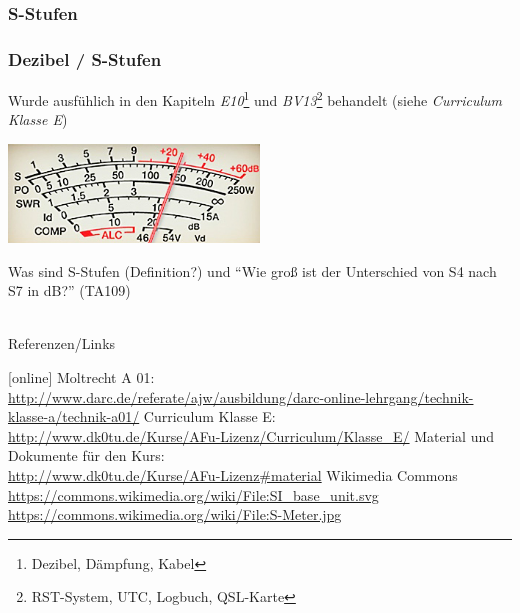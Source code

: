 \subsubsection{S-Stufen}

\begin{frame}
    \frametitle{Dezibel / S-Stufen}

    Wurde ausfühlich in den Kapiteln \emph{E10}\footnote{Dezibel, Dämpfung,
    Kabel} und \emph{BV13}\footnote{RST-System, UTC, Logbuch, QSL-Karte}
    behandelt (siehe \emph{Curriculum Klasse E}\hyperlink{refs}{\cite{curr}})

    \begin{center}
        \includegraphics[width=0.5\textwidth,height=0.2\textheight,keepaspectratio]{e10/S-Meter.jpg}
        \tiny \hyperlink{refs}{\cite{wc}}
    \end{center}


    \begin{exampleblock}{Was sind S-Stufen (Definition?) und ``Wie groß ist der
                         Unterschied von S4 nach S7 in dB?'' (TA109)}
    \end{exampleblock}

\end{frame}

\renewcommand{\refname}{Referenzen}

\hypertarget{refs}{}
\textcolor{white}{} \\ %
\Large Referenzen/Links
\footnotesize

\begin{thebibliography}{}
    [online]
     Moltrecht A 01: \\
                    \url{http://www.darc.de/referate/ajw/ausbildung/darc-online-lehrgang/technik-klasse-a/technik-a01/}
      Curriculum Klasse E: \\
                    \url{http://www.dk0tu.de/Kurse/AFu-Lizenz/Curriculum/Klasse_E/}
       Material und Dokumente für den Kurs: \\
                    \url{http://www.dk0tu.de/Kurse/AFu-Lizenz#material}
        Wikimedia Commons \\
                    \url{https://commons.wikimedia.org/wiki/File:SI_base_unit.svg}\\
                    \url{https://commons.wikimedia.org/wiki/File:S-Meter.jpg}
\end{thebibliography} 


